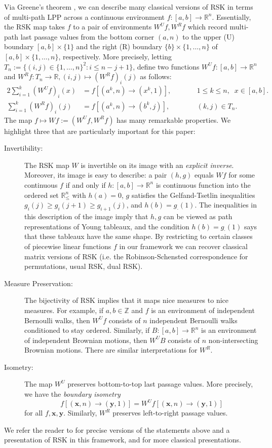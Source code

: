 \documentclass[11pt]{article}
\newcommand{\Z}{\mathbb{Z}}
\newcommand{\R}{\mathbb{R}}
\newcommand{\X}{\times}
\newcommand{\bx}{\mathbf{x}}
\newcommand{\by}{\mathbf{y}}
\theoremstyle{definition} %
\theoremstyle{remark} %
\begin{document}
Via Greene's theorem \cite{greene1974extension}, we can describe many classical versions of RSK in terms of multi-path LPP across a continuous environment $f:[a, b] \to \R^n$. Essentially, the RSK map takes $f$ to a pair of environments $W^U f, W^R f$ which record multi-path last passage values from the bottom corner $(a, n)$ to the upper (U) boundary $[a, b] \X \{1\}$ and the right (R) boundary $\{b\} \X \{1, \dots, n\}$ of $[a, b] \X \{1, \dots, n\}$, respectively. More precisely, letting $T_n := \{(i, j) \in \{1, \dots, n\}^2 : i \le n - j + 1\}$, define two functions $W^Uf:[a, b] \to \R^n$ and $W^R f: T_n \to \R, (i, j) \mapsto (W^R f)_i(j)$ as follows:
\begin{alignat}{2}
	\label{E:WiUj}
\sum_{i=1}^k (W^Uf)_i(x) &= f[(a^k, n) \to (x^k, 1)], \qquad &&1 \le k \le n, \;\; x \in [a, b]. \\
\nonumber
	\sum_{i=1}^k (W^R f)_i(j) &= f[(a^k, n) \to (b^k, j)], \qquad &&(k, j) \in T_n.
\end{alignat}
The map $f \mapsto Wf := (W^U f, W^R f)$ has many remarkable properties. We highlight three that are particularly important for this paper:
\begin{description}
	\item[Invertibility:] The RSK map $W$ is invertible on its image with an \textit{explicit inverse}. Moreover, its image is easy to describe: a pair $(h, g)$ equals $Wf$ for some continuous $f$ if and only if $h:[a, b] \to \R^n$ is continuous function into the ordered set $\R^n_\le$ with $h(a) = 0$, $g$ satisfies the Gelfand-Tsetlin inequalities $g_i(j) \ge g_i(j+1) \ge g_{i+1}(j)$, and $h(b) = g_\cdot(1)$. The inequalities in this description of the image imply that $h, g$ can be viewed as path representations of Young tableaux, and the condition $h(b) = g_\cdot(1)$ says that these tableaux have the same shape. By restricting to certain classes of piecewise linear functions $f$ in our framework we can recover classical matrix versions of RSK (i.e. the Robinson-Schensted correspondence for permutations, usual RSK, dual RSK).
	\item[Measure Preservation:] The bijectivity of RSK implies that it maps nice measures to nice measures. For example, if $a, b \in \Z$ and $f$ is an environment of independent Bernoulli walks, then $W^U f$ consists of $n$ independent Bernoulli walks conditioned to stay ordered. Similarly, if $B:[a, b] \to \R^n$ is an environment of independent Brownian motions, then $W^U B$ consists of $n$ non-intersecting Brownian motions. There are similar interpretations for $W^R$.
	\item[Isometry:] The map $W^U$ preserves bottom-to-top last passage values. More precisely, we have the \emph{boundary isometry}
	\begin{equation}
		\label{E:isom-intro}
		f[(\bx, n) \to (\by, 1)] = W^U f[(\bx, n) \to (\by, 1)]
	\end{equation}
	for all $f, \bx, \by$. Similarly, $W^R$ preserves left-to-right passage values.
\end{description}
We refer the reader to \cite{dauvergne2022rsk} for precise versions of the statements above and a presentation of RSK in this framework, and \cite{fulton1997young, stanley1999enumerative} for more classical presentations.
\end{document}
